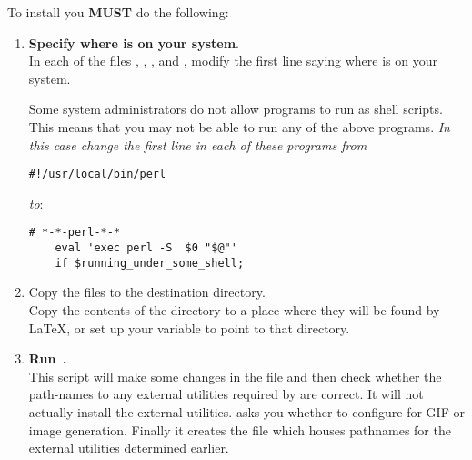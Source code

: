 \begin{changebar}
To install \latextohtml{} you \textbf{MUST} do the following:
%
\begin{enumerate}
\item 
\textbf{Specify where \Perl{} is on your system}. \\
In each of the files , , ,
 and ,
modify the first line saying where \Perl{} is on your system.


\noindent
Some system administrators do not allow \Perl{} programs to run as shell scripts. 
This means that you may not be able to run any of the above programs. 
\emph{In this case change the first line in each of these programs from }
\html{\smallskip}
\begin{small}
\verb|#!/usr/local/bin/perl | 
\end{small}
\html{\smallskip}\emph{to}:
\begin{small}
\begin{verbatim}
# *-*-perl-*-*
    eval 'exec perl -S  $0 "$@"'
    if $running_under_some_shell; 
\end{verbatim}
\end{small}

%
%
\item
Copy the files to the destination directory.\\
Copy the contents of the  directory to a place where they
will be found by \LaTeX, or set up your  variable to point
to that directory.

%
%
\item 
\textbf{Run \,.} \\
This \Perl{} script will make some changes in the  file
and then check whether the path-names to any external utilities
required by  are correct.
It will not actually install the external utilities. 
 asks you whether to configure for GIF or
 image generation.
Finally it creates the file  which houses pathnames for the
external utilities determined earlier.


\end{enumerate}
\end{changebar}
